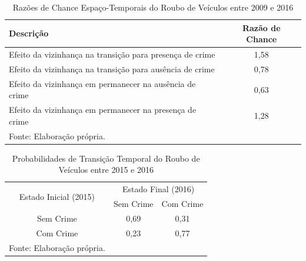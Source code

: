\documentclass[12pt,openright,oneside,a4paper,english,french,spanish]{abntex2}
\numberwithin{table}{section} %
\numberwithin{figure}{section} %
\begin{document}
\begin{subappendices}
\begin{table}[H]
\centering
\caption{Razões de Chance Espaço-Temporais do Roubo de Veículos entre 2009 e 2016}
        \begin{tabular}{lc}
            \hline
            {\textbf{Descrição}} & {\textbf{Razão de Chance}} \\\hline
            {Efeito da vizinhança na transição para presença de crime} & {1,58} \\
            {Efeito da vizinhança na transição para ausência de crime} & {0,78} \\
            {Efeito da vizinhança em permanecer na ausência de crime} & {0,63} \\
            {Efeito da vizinhança em permanecer na presença de crime} & {1,28} \\\hline
            \tiny Fonte: Elaboração própria.
        \end{tabular}
    \label{tab:odds_espaco_tempo_roub_vei_2009_2016}
\end{table}

















\begin{table}[H]
\centering
\caption{Probabilidades de Transição Temporal do Roubo de Veículos entre 2015 e 2016}
        \begin{tabular}{ccc}
            \hline
            \multirow{2}{*}{Estado Inicial (2015)} & \multicolumn{2}{c}{Estado Final (2016)}  \\\cline{2-3} 
                                     & \multicolumn{1}{l}{Sem Crime} & \multicolumn{1}{l}{Com Crime} \\\hline
            {Sem Crime} & {0,69} & {0,31} \\                \hline
            {Com Crime} & {0,23} & {0,77} \\                \hline
            \tiny Fonte: Elaboração própria.
        \end{tabular}
    \label{tab:prob_tempo_roub_vei_2015_2016}
\end{table}


\end{subappendices}
\end{document}

